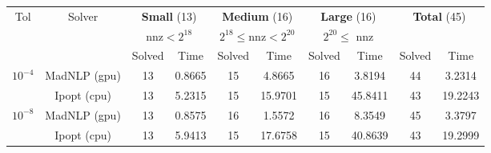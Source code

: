 \begin{tabular}{|c|c|cc|cc|cc|cc|}
  \hline
  \multirow{ 3}{*}{Tol} & \multirow{ 3}{*}{Solver} & \multicolumn{2}{c|}{\textbf{Small} (13)}& \multicolumn{2}{c|}{\textbf{Medium} (16)}& \multicolumn{2}{c|}{\textbf{Large} (16)}& \multicolumn{2}{c|}{\multirow{2}{*}{\textbf{Total} (45)}}\\
                        && \multicolumn{2}{c|}{nnz$<2^{18}$}& \multicolumn{2}{c|}{$2^{18}\leq$nnz$<2^{20}$}& \multicolumn{2}{c|}{$2^{20}\leq$ nnz}&&\\
                        &&  Solved & Time &  Solved & Time &  Solved & Time &  Solved & Time \\
  \hline
    \multirow{2}{*}{$10^{-4}$} & MadNLP (gpu) & 13 & 0.8665 & 15 & 4.8665 & 16 & 3.8194 & 44 & 3.2314  \\
                        & Ipopt (cpu) & 13 & 5.2315 & 15 & 15.9701 & 15 & 45.8411 & 43 & 19.2243  \\

  \hline
    \multirow{2}{*}{$10^{-8}$} & MadNLP (gpu) & 13 & 0.8575 & 16 & 1.5572 & 16 & 8.3549 & 45 & 3.3797  \\
                        & Ipopt (cpu) & 13 & 5.9413 & 15 & 17.6758 & 15 & 40.8639 & 43 & 19.2999  \\

  \hline
\end{tabular}
